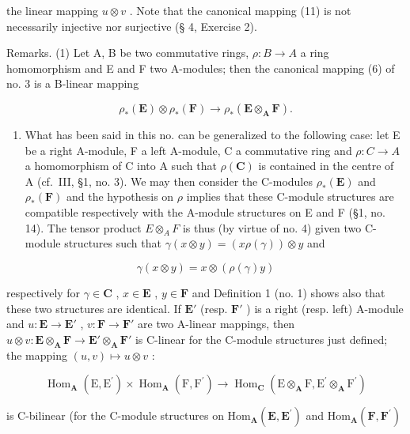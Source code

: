 the linear mapping \(u \otimes v\) . Note that the canonical mapping (11) is not necessarily injective nor surjective (§ 4, Exercise 2).

Remarks. (1) Let A, B be two commutative rings, \(\rho:B\to A\) a ring homomorphism and E and F two A-modules; then the canonical mapping (6) of no. 3 is a B-linear mapping

\[
\rho_ {*} (\mathbf {E}) \otimes \rho_ {*} (\mathbf {F}) \rightarrow \rho_ {*} (\mathbf {E} \otimes_ {\mathbf {A}} \mathbf {F}).\tag{12}
\]

\begin{enumerate}
\def\labelenumi{(\arabic{enumi})}
\setcounter{enumi}{1}
\tightlist
\item
  What has been said in this no. can be generalized to the following case: let E be a right A-module, F a left A-module, C a commutative ring and \(\rho:C\to A\) a homomorphism of C into A such that \(\rho(\mathbf{C})\) is contained in the centre of A (cf.~III, §1, no. 3). We may then consider the C-modules \(\rho_{*}(\mathbf{E})\) and \(\rho_{*}(\mathbf{F})\) and the hypothesis on \(\rho\) implies that these C-module structures are compatible respectively with the A-module structures on E and F (§1, no. 14). The tensor product \(E\otimes_{A}F\) is thus (by virtue of no. 4) given two C-module structures such that \(\gamma(x\otimes y)=(x\rho(\gamma))\otimes y\) and
\end{enumerate}

\[
\gamma (x \otimes y) = x \otimes (\rho (\gamma) y)
\]

respectively for \(\gamma\in\mathbf{C}\) , \(x\in\mathbf{E}\) , \(y\in\mathbf{F}\) and Definition 1 (no. 1) shows also that these two structures are identical. If \(\mathbf{E}'\) (resp. \(\mathbf{F}'\) ) is a right (resp. left) A-module and \(u:\mathbf{E}\to\mathbf{E}'\) , \(v:\mathbf{F}\to\mathbf{F}'\) are two A-linear mappings, then \(u\otimes v:\mathbf{E}\otimes_{\mathbf{A}}\mathbf{F}\to\mathbf{E}'\otimes_{\mathbf{A}}\mathbf{F}'\) is C-linear for the C-module structures just defined; the mapping \((u,v)\mapsto u\otimes v\) :

\[
\operatorname{Hom} _ {\mathbf {A}} (\mathrm{E}, \mathrm{E} ^ {\prime}) \times \operatorname{Hom} _ {\mathbf {A}} (\mathrm{F}, \mathrm{F} ^ {\prime}) \rightarrow \operatorname{Hom} _ {\mathbf {C}} (\mathrm{E} \otimes_ {\mathbf {A}} \mathrm{F}, \mathrm{E} ^ {\prime} \otimes_ {\mathbf {A}} \mathrm{F} ^ {\prime})
\]

is C-bilinear (for the C-module structures on \(\mathrm{Hom}_{\mathbf{A}}(\mathbf{E},\mathbf{E}^{\prime})\) and \(\mathrm{Hom}_{\mathbf{A}}(\mathbf{F},\mathbf{F}^{\prime})\)

